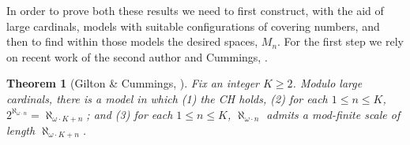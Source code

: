 \documentclass{article}
\newtheorem{thm}{Theorem}[section]
\begin{document}
In order to prove both these results we need to first construct, with the aid of large cardinals, models with suitable configurations of covering numbers, and then to find within those models the desired spaces, $M_n$. 
For the first step we rely on recent work of the second author and Cummings, \cite{GiltonCummings}.

\begin{thm}[Gilton \& Cummings, \cite{GiltonCummings}] Fix an integer $K \ge 2$. Modulo large cardinals, there is a model in which
(1) the \textsc{CH} holds, (2) for each $1\leq n\leq K$, $2^{\aleph_{\omega\cdot n}}=\aleph_{\omega\cdot K +n}$; and
    (3) for each $1\leq n\leq K$, $\aleph_{\omega\cdot n}$ admits a mod-finite scale of length $\aleph_{\omega\cdot K+n}$.
\end{thm}
\end{document}
